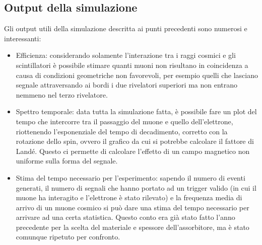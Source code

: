 \subsection{Output della simulazione}
Gli output utili della simulazione descritta ai punti precedenti sono numerosi e interessanti:
\begin{itemize}
\item Efficienza: considerando solamente l'interazione tra i raggi cosmici e gli scintillatori è possibile stimare quanti muoni non risultano in coincidenza a causa
di condizioni geometriche non favorevoli, per esempio quelli che lasciano segnale attraversando ai bordi i due rivelatori superiori ma non entrano nemmeno nel terzo
rivelatore.
\item Spettro temporale: data tutta la simulazione fatta, è possibile fare un plot del tempo che intercorre tra il passaggio del muone e quello dell'elettrone, riottenendo
l'esponenziale del tempo di decadimento, corretto con la rotazione dello spin, ovvero il grafico da cui si potrebbe calcolare il fattore di Land\'e. Questo ci permette di calcolare l'effetto di un campo magnetico non uniforme sulla forma del segnale.
\item Stima del tempo necessario per l'esperimento: sapendo il numero di eventi generati, il numero di segnali che hanno portato ad un trigger valido (in cui il muone ha interagito e l'elettrone \`e stato rilevato) e la frequenza media di arrivo di un muone cosmico si può dare una stima del tempo necessario per arrivare ad una certa statistica. Questo conto era gi\`a stato fatto l'anno precedente per la scelta del materiale e spessore dell'assorbitore, ma \`e stato comunque ripetuto per confronto.
\end{itemize}




